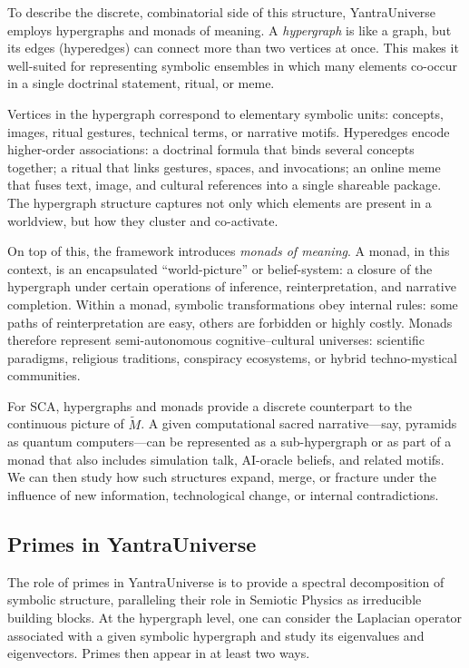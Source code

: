 \documentclass[12]{amsart}
\theoremstyle{plain}
\begin{document}
To describe the discrete, combinatorial side of this structure, YantraUniverse employs hypergraphs and monads of meaning. A \emph{hypergraph} is like a graph, but its edges (hyperedges) can connect more than two vertices at once. This makes it well-suited for representing symbolic ensembles in which many elements co-occur in a single doctrinal statement, ritual, or meme.

Vertices in the hypergraph correspond to elementary symbolic units: concepts, images, ritual gestures, technical terms, or narrative motifs. Hyperedges encode higher-order associations: a doctrinal formula that binds several concepts together; a ritual that links gestures, spaces, and invocations; an online meme that fuses text, image, and cultural references into a single shareable package. The hypergraph structure captures not only which elements are present in a worldview, but how they cluster and co-activate.

On top of this, the framework introduces \emph{monads of meaning}. A monad, in this context, is an encapsulated ``world-picture'' or belief-system: a closure of the hypergraph under certain operations of inference, reinterpretation, and narrative completion. Within a monad, symbolic transformations obey internal rules: some paths of reinterpretation are easy, others are forbidden or highly costly. Monads therefore represent semi-autonomous cognitive–cultural universes: scientific paradigms, religious traditions, conspiracy ecosystems, or hybrid techno-mystical communities.

For SCA, hypergraphs and monads provide a discrete counterpart to the continuous picture of $\tilde M$. A given computational sacred narrative—say, pyramids as quantum computers—can be represented as a sub-hypergraph or as part of a monad that also includes simulation talk, AI-oracle beliefs, and related motifs. We can then study how such structures expand, merge, or fracture under the influence of new information, technological change, or internal contradictions.

\subsection{Primes in YantraUniverse}

The role of primes in YantraUniverse is to provide a spectral decomposition of symbolic structure, paralleling their role in Semiotic Physics as irreducible building blocks. At the hypergraph level, one can consider the Laplacian operator associated with a given symbolic hypergraph and study its eigenvalues and eigenvectors. Primes then appear in at least two ways.
\end{document}
